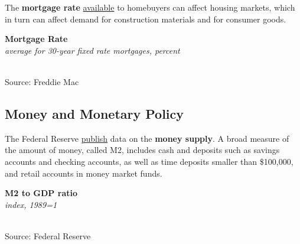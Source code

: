 \documentclass{report}
\makeatletter
\newcommand{\tbllink}[1]{\href{https://raw.githubusercontent.com/bdecon/US-chartbook/master/chartbook/data/#1}{\faTable}}
\newcommand*\short[1]{\expandafter\@gobbletwo\number\numexpr#1\relax}
\newcommand{\dateaxisticks}{
		date coordinates in=x, axis line style={draw=none},
		xmax={2023-02-15},
		max space between ticks=40,	    
		xtick={{1990-01-01}, {1992-01-01}, {1994-01-01}, 
			{1996-01-01}, {1998-01-01}, {2000-01-01}, 
			{2002-01-01}, {2004-01-01}, {2006-01-01},
			{2008-01-01}, {2010-01-01}, {2012-01-01}, {2014-01-01},
		    {2016-01-01}, {2018-01-01}, {2020-01-01}, {2022-01-01}, 
		    {2024-01-01}, {2026-01-01}},
		minor xtick={{1989-01-01}, {1991-01-01}, {1993-01-01},
			{1995-01-01}, {1997-01-01}, {1999-01-01}, 
			{2001-01-01}, {2003-01-01}, {2005-01-01}, {2007-01-01},
		    {2009-01-01}, {2011-01-01}, {2013-01-01}, {2015-01-01},
		    {2017-01-01}, {2019-01-01}, {2021-01-01}, {2023-01-01}, 
		    {2025-01-01}, {2027-01-01}},
		enlarge y limits={0.06}, enlarge x limits={0.01},
		}
\newcommand{\shdateaxisticks}{
		date coordinates in=x, axis line style={draw=none},
		xmax={2023-02-15},
		max space between ticks=40,	    
		xtick={{1990-01-01}, {1995-01-01}, {2000-01-01}, 
			{2005-01-01}, {2010-01-01}, {2015-01-01}, {2020-01-01}},
		minor xtick={},
		enlarge y limits={0.06}, enlarge x limits={0.01},
		}
\newcommand{\bbar}[2]{extra #1 ticks = {{#2}}, extra #1 tick labels = ,
		extra #1 tick style = {grid=major, grid style={thick, black!25}},}
\newcommand{\stdline}[4]{\addplot[very thick, no markers, color=#1] 
		table [x=#2, y=#3, col sep=comma] {#4};	}
\newcommand{\thickline}[4]{\addplot[ultra thick, no markers, color=#1] 
		table [x=#2, y=#3, col sep=comma] {#4};	}
\newcommand{\rbars}{
		\fill[color=black!10] (axis cs:{1990-07-01},\pgfkeysvalueof{/pgfplots/ymin}) rectangle 
			(axis cs:{1991-03-01}, \pgfkeysvalueof{/pgfplots/ymax});
		\fill[color=black!10] (axis cs:{2007-12-01},\pgfkeysvalueof{/pgfplots/ymin}) rectangle 
			(axis cs:{2009-07-01}, \pgfkeysvalueof{/pgfplots/ymax});
		\fill[color=black!10] (axis cs:{2001-03-01},\pgfkeysvalueof{/pgfplots/ymin}) rectangle 
			(axis cs:{2001-11-01}, \pgfkeysvalueof{/pgfplots/ymax});
		\fill[color=black!10] (axis cs:{2020-02-01},\pgfkeysvalueof{/pgfplots/ymin}) rectangle 
			(axis cs:{2020-05-01}, \pgfkeysvalueof{/pgfplots/ymax});}
\makeatother
\begin{document}
{\begin{minipage}{0.76\textwidth}
\small The \textbf{mortgage rate} \href{https://www.freddiemac.com/pmms/pmms30}{available} to homebuyers can affect housing markets, which in turn can affect demand for construction materials and for consumer goods.  
\vspace{0.5mm} 

\normalsize \textbf{Mortgage Rate}\\
\footnotesize{\textit{average for 30-year fixed rate mortgages, percent}}\\
\hspace*{-2mm} \\
\footnotesize{Source: Freddie Mac} \hfill \tbllink{mortgage.csv}
\end{minipage}
\newpage
\hypertarget{capmm}{}
\begin{minipage}{0.76\textwidth}
\subsection*{Money and Monetary Policy}
\small The Federal Reserve \href{https://www.federalreserve.gov/releases/h6/current/default.htm}{publish} data on the \textbf{money supply}. A broad measure of the amount of money, called M2, includes cash and deposits such as savings accounts and checking accounts, as well as time deposits smaller than \$100,000, and retail accounts in money market funds. 

\begin{minipage}{0.48\textwidth}

\end{minipage} \hfill \begin{minipage}{0.45\textwidth}
\normalsize \textbf{M2 to GDP ratio}\\
\footnotesize{\textit{index, 1989=1}}\\
\hspace*{-2mm} \\
\footnotesize{Source: Federal Reserve} \hfill \tbllink{m2gdp.csv}
\end{minipage}
\vspace{2mm}


\end{minipage}}
\end{document}

